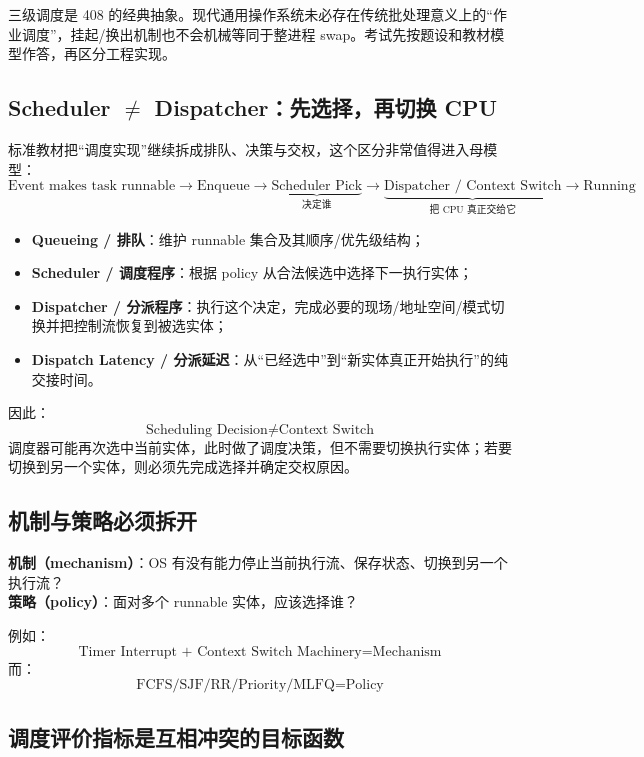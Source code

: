 \documentclass[11pt,a4paper]{ctexart}
\newcommand{\kw}[1]{\textbf{#1}}
\begin{document}
\begin{warn}[教材模型与现代系统边界]
三级调度是 408 的经典抽象。现代通用操作系统未必存在传统批处理意义上的“作业调度”，挂起/换出机制也不会机械等同于整进程 swap。考试先按题设和教材模型作答，再区分工程实现。
\end{warn}

\subsection{Scheduler $\neq$ Dispatcher：先选择，再切换 CPU}

标准教材把“调度实现”继续拆成排队、决策与交权，这个区分非常值得进入母模型：
\[
\boxed{
\text{Event makes task runnable}
\rightarrow
\text{Enqueue}
\rightarrow
\underbrace{\text{Scheduler Pick}}_{\text{决定谁}}
\rightarrow
\underbrace{\text{Dispatcher / Context Switch}}_{\text{把 CPU 真正交给它}}
\rightarrow
\text{Running}
}
\]
\begin{itemize}
\item \kw{Queueing / 排队}：维护 runnable 集合及其顺序/优先级结构；
\item \kw{Scheduler / 调度程序}：根据 policy 从合法候选中选择下一执行实体；
\item \kw{Dispatcher / 分派程序}：执行这个决定，完成必要的现场/地址空间/模式切换并把控制流恢复到被选实体；
\item \kw{Dispatch Latency / 分派延迟}：从“已经选中”到“新实体真正开始执行”的纯交接时间。
\end{itemize}

因此：
\[
\boxed{\text{Scheduling Decision}\neq\text{Context Switch}}
\]
调度器可能再次选中当前实体，此时做了调度决策，但不需要切换执行实体；若要切换到另一个实体，则必须先完成选择并确定交权原因。

\subsection{机制与策略必须拆开}

\begin{corebox}[机制 / 策略]
\textbf{机制（mechanism）}：OS 有没有能力停止当前执行流、保存状态、切换到另一个执行流？\\
\textbf{策略（policy）}：面对多个 runnable 实体，应该选择谁？
\end{corebox}

例如：
\[
\text{Timer Interrupt + Context Switch Machinery}=\text{Mechanism}
\]
而：
\[
\text{FCFS/SJF/RR/Priority/MLFQ}=\text{Policy}
\]

\subsection{调度评价指标是互相冲突的目标函数}
\end{document}
